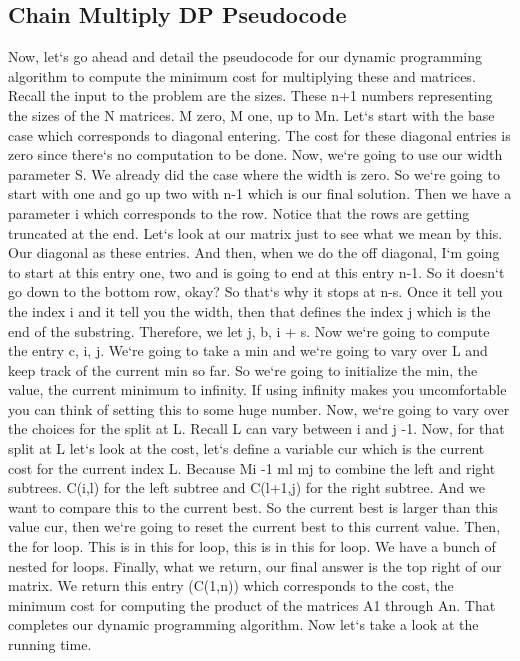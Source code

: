 \subsection{Chain Multiply  DP Pseudocode}
Now, let`s go ahead and detail the pseudocode for our dynamic programming algorithm to compute the minimum cost for multiplying these and matrices.
Recall the input to the problem are the sizes.
These n+1 numbers representing the sizes of the N matrices.
M zero, M one, up to Mn.
Let`s start with the base case which corresponds to diagonal entering.
The cost for these diagonal entries is zero since there`s no computation to be done.
Now, we`re going to use our width parameter S\@.
We already did the case where the width is zero.
So we`re going to start with one and go up two with n-1 which is our final solution.
Then we have a parameter i which corresponds to the row.
Notice that the rows are getting truncated at the end.
Let`s look at our matrix just to see what we mean by this.
Our diagonal as these entries.
And then, when we do the off diagonal, I`m going to start at this entry one, two and is going to end at this entry n-1.
So it doesn`t go down to the bottom row, okay? So that`s why it stops at n-s.
Once it tell you the index i and it tell you the width, then that defines the index j which is the end of the substring.
Therefore, we let j, b, i + s.
Now we`re going to compute the entry c, i, j.
We`re going to take a min and we`re going to vary over L and keep track of the current min so far.
So we`re going to initialize the min, the value, the current minimum to infinity.
If using infinity makes you uncomfortable you can think of setting this to some huge number.
Now, we`re going to vary over the choices for the split at L\@.
Recall L can vary between i and j -1.
Now, for that split at L let`s look at the cost, let`s define a variable cur which is the current cost for the current index L\@.
Because Mi -1 ml mj to combine the left and right subtrees.
C(i,l) for the left subtree and C(l+1,j) for the right subtree.
And we want to compare this to the current best.
So the current best is larger than this value cur, then we`re going to reset the current best to this current value.
Then, the for loop.
This is in this for loop, this is in this for loop.
We have a bunch of nested for loops.
Finally, what we return, our final answer is the top right of our matrix.
We return this entry (C(1,n)) which corresponds to the cost, the minimum cost for computing the product of the matrices A1 through An.
That completes our dynamic programming algorithm.
Now let`s take a look at the running time.
